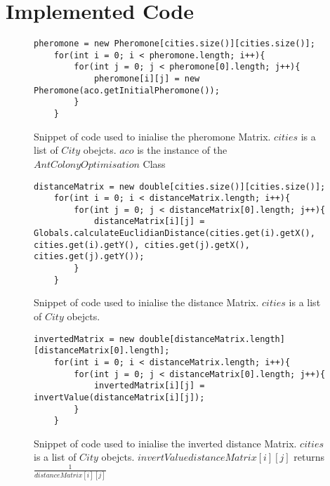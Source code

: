 \chapter{Implemented Code}
\renewcommand{\thechapter}{\Alph{chapter}}

\begin{figure}[H]
\begin{lstlisting}
pheromone = new Pheromone[cities.size()][cities.size()];
	for(int i = 0; i < pheromone.length; i++){
		for(int j = 0; j < pheromone[0].length; j++){
			pheromone[i][j] = new Pheromone(aco.getInitialPheromone());
		}
	}
\end{lstlisting}
\caption[Pheromone Initialisation Code]{Snippet of code used to inialise the pheromone Matrix. $cities$ is a list of $City$ obejcts. $aco$ is the instance of the $AntColonyOptimisation$ Class}
\label{initPheroCode}
\end{figure}

\begin{figure}[H]
\begin{lstlisting}
distanceMatrix = new double[cities.size()][cities.size()];
	for(int i = 0; i < distanceMatrix.length; i++){
		for(int j = 0; j < distanceMatrix[0].length; j++){
			distanceMatrix[i][j] = Globals.calculateEuclidianDistance(cities.get(i).getX(), cities.get(i).getY(), cities.get(j).getX(), cities.get(j).getY());
		}
	}
\end{lstlisting}
\caption[Distance Matrix Initialisation Code]{Snippet of code used to inialise the distance Matrix. $cities$ is a list of $City$ obejcts.}
\label{initDistanceCode}
\end{figure}

\begin{figure}[H]
\begin{lstlisting}
invertedMatrix = new double[distanceMatrix.length][distanceMatrix[0].length];	
	for(int i = 0; i < distanceMatrix.length; i++){
		for(int j = 0; j < distanceMatrix[0].length; j++){
			invertedMatrix[i][j] = invertValue(distanceMatrix[i][j]);
		}
	}
\end{lstlisting}
\caption[Inverted Distance Matrix Initialisation Code]{Snippet of code used to inialise the inverted distance Matrix. $cities$ is a list of $City$ obejcts. $invertValue{distanceMatrix[i][j]}$ returns $\frac{1}{distanceMatrix[i][j]}$}
\label{initInverteddistanceCode}
\end{figure}

